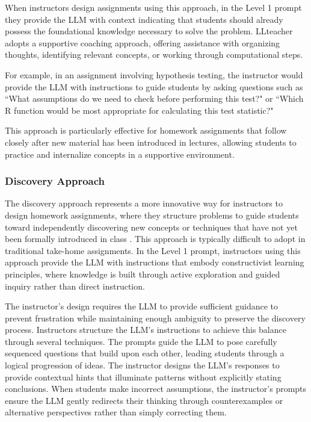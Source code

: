 \documentclass[
  12pt]{article}
\begin{document}
When instructors design assignments using this approach, in the Level 1 prompt they provide the LLM with context indicating that students should already possess the foundational knowledge necessary to solve the problem.
LLteacher adopts a supportive coaching approach, offering assistance with organizing thoughts, identifying relevant concepts, or working through computational steps.

For example, in an assignment involving hypothesis testing, the instructor would provide the LLM with instructions to guide students by asking questions such as ``What assumptions do we need to check before performing this test?" or ``Which R function would be most appropriate for calculating this test statistic?"

This approach is particularly effective for homework assignments that follow closely after new material has been introduced in lectures, allowing students to practice and internalize concepts in a supportive environment.

\subsubsection{Discovery Approach}

The discovery approach represents a more innovative way for instructors to design homework assignments, where they structure problems to guide students toward independently discovering new concepts or techniques that have not yet been formally introduced in class \citep{alfieri-et-al-2011}.
This approach is typically difficult to adopt in traditional take-home assignments.
In the Level 1 prompt, instructors using this approach provide the LLM with instructions that embody constructivist learning principles, where knowledge is built through active exploration and guided inquiry rather than direct instruction.

The instructor's design requires the LLM to provide sufficient guidance to prevent frustration while maintaining enough ambiguity to preserve the discovery process.
Instructors structure the LLM's instructions to achieve this balance through several techniques.
The prompts guide the LLM to pose carefully sequenced questions that build upon each other, leading students through a logical progression of ideas.
The instructor designs the LLM's responses to provide contextual hints that illuminate patterns without explicitly stating conclusions.
When students make incorrect assumptions, the instructor's prompts ensure the LLM gently redirects their thinking through counterexamples or alternative perspectives rather than simply correcting them.
\end{document}
